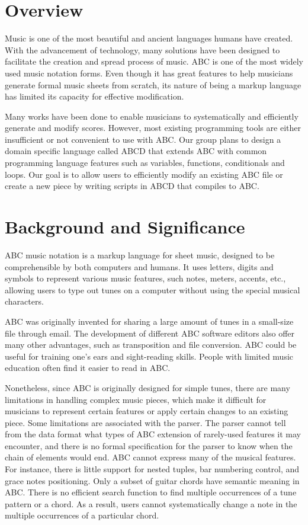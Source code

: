 \section{Overview}

Music is one of the most beautiful and ancient languages humans have created. With the advancement of technology, many solutions have been designed to facilitate the creation and spread process of music. ABC is one of the most widely used music notation forms. Even though it has great features to help musicians generate formal music sheets from scratch, its nature of being a markup language has limited its capacity for effective modification.

Many works have been done to enable musicians to systematically and efficiently generate and modify scores. However, most existing programming tools are either insufficient or not convenient to use with ABC. Our group plans to design a domain specific language called ABCD that extends ABC with common programming language features such as variables, functions, conditionals and loops. Our goal is to allow users to efficiently modify an existing ABC file or create a new piece by writing scripts in ABCD that compiles to ABC.

\section{Background and Significance}

ABC music notation is a markup language for sheet music, designed to be comprehensible by both computers and humans. It uses letters, digits and symbols to represent various music features, such notes, meters, accents, etc., allowing users to type out tunes on a computer without using the special musical characters\cite{Walshaw11}.

ABC was originally invented for sharing a large amount of tunes in a small-size file through email\cite{Johnson17}. The development of different ABC software editors also offer many other advantages, such as transposition and file conversion. ABC could be useful for training one's ears and sight-reading skills. People with limited music education often find it easier to read in ABC\cite{Mary14}. 

Nonetheless, since ABC is originally designed for simple tunes, there are many limitations in handling complex music pieces, which make it difficult for musicians to represent certain features or apply certain changes to an existing piece. Some limitations are associated with the parser. The parser cannot tell from the data format what types of ABC extension of rarely-used features it may encounter, and there is no formal specification for the parser to know when the chain of elements would end\cite{Cuthbert14}. ABC cannot express many of the musical features. For instance, there is little support for nested tuples, bar numbering control, and grace notes positioning\cite{Cuthbert14}. Only a subset of guitar chords have semantic meaning in ABC\cite{Chambers02}. There is no efficient search function to find multiple occurrences of a tune pattern or a chord. As a result, users cannot systematically change a note in the multiple occurrences of a particular chord. 

